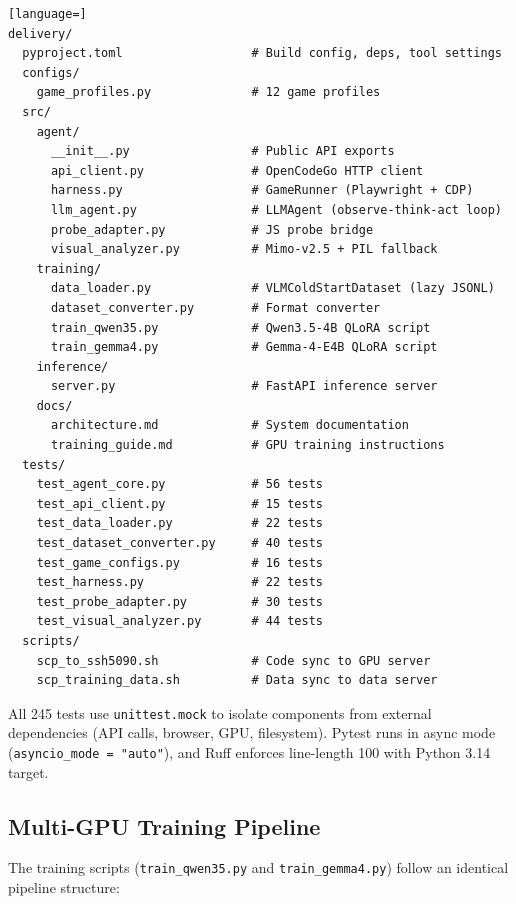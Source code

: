 \documentclass[11pt,a4paper]{article}
\begin{document}
\begin{lstlisting}[language=]
delivery/
  pyproject.toml                  # Build config, deps, tool settings
  configs/
    game_profiles.py              # 12 game profiles
  src/
    agent/
      __init__.py                 # Public API exports
      api_client.py               # OpenCodeGo HTTP client
      harness.py                  # GameRunner (Playwright + CDP)
      llm_agent.py                # LLMAgent (observe-think-act loop)
      probe_adapter.py            # JS probe bridge
      visual_analyzer.py          # Mimo-v2.5 + PIL fallback
    training/
      data_loader.py              # VLMColdStartDataset (lazy JSONL)
      dataset_converter.py        # Format converter
      train_qwen35.py             # Qwen3.5-4B QLoRA script
      train_gemma4.py             # Gemma-4-E4B QLoRA script
    inference/
      server.py                   # FastAPI inference server
    docs/
      architecture.md             # System documentation
      training_guide.md           # GPU training instructions
  tests/
    test_agent_core.py            # 56 tests
    test_api_client.py            # 15 tests
    test_data_loader.py           # 22 tests
    test_dataset_converter.py     # 40 tests
    test_game_configs.py          # 16 tests
    test_harness.py               # 22 tests
    test_probe_adapter.py         # 30 tests
    test_visual_analyzer.py       # 44 tests
  scripts/
    scp_to_ssh5090.sh             # Code sync to GPU server
    scp_training_data.sh          # Data sync to data server
\end{lstlisting}

All 245 tests use \texttt{unittest.mock} to isolate components from external dependencies (API calls, browser, GPU, filesystem). Pytest runs in async mode (\texttt{asyncio\_mode = "auto"}), and Ruff enforces line-length 100 with Python 3.14 target.

\subsection{Multi-GPU Training Pipeline}

The training scripts (\texttt{train\_qwen35.py} and \texttt{train\_gemma4.py}) follow an identical pipeline structure:
\end{document}
